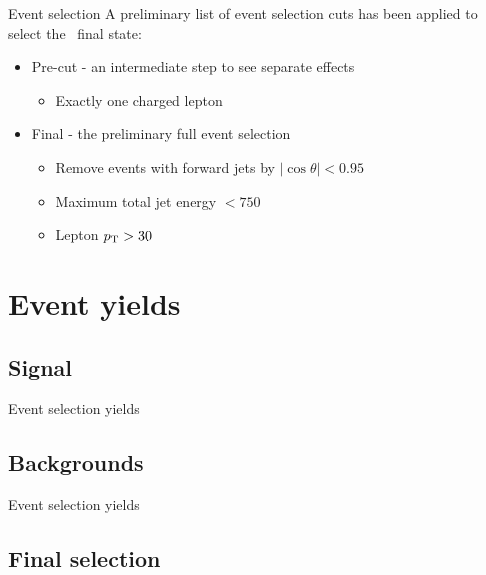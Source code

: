 \documentclass{beamer}
\newcommand{\texpath}{../analysis/tex/}
\begin{document}
\begin{frame}{Event selection}
A preliminary list of event selection cuts has been applied to select the \qqln\ final state:
\begin{itemize}
%
\item Pre-cut - an intermediate step to see separate effects
\begin{itemize}
\item Exactly one charged lepton
\end{itemize}
%
\item Final - the preliminary full event selection
\begin{itemize}
\item Remove events with forward jets by $|\cos \theta| < 0.95$
\item Maximum total jet energy $< 750$~\GeV
\item Lepton $p_\mathrm{T} > 30$~\GeV
\end{itemize}
%
\end{itemize}
\end{frame}









\section{Event yields}

\subsection{Signal}

\begin{frame}{Event selection yields}

\end{frame}

\subsection{Backgrounds}

\begin{frame}{Event selection yields}

\end{frame}

\subsection{Final selection}
\end{document}
